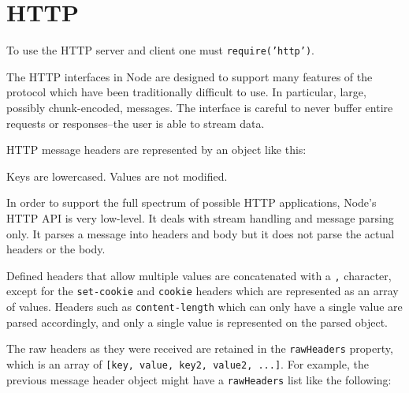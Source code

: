 \section{HTTP}

\begin{Shaded}
\begin{Highlighting}[]
\NormalTok{: } 
\end{Highlighting}
\end{Shaded}

To use the HTTP server and client one must \texttt{require('http')}.

The HTTP interfaces in Node are designed to support many features of the
protocol which have been traditionally difficult to use. In particular,
large, possibly chunk-encoded, messages. The interface is careful to
never buffer entire requests or responses--the user is able to stream
data.

HTTP message headers are represented by an object like this:

\begin{Shaded}
\begin{Highlighting}[]
\NormalTok{\{ }\NormalTok{: }\NormalTok{,}
  \NormalTok{: }\NormalTok{,}
  \NormalTok{: }\NormalTok{,}
  \NormalTok{: }\NormalTok{,}
  \NormalTok{: } \NormalTok{\}}
\end{Highlighting}
\end{Shaded}

Keys are lowercased. Values are not modified.

In order to support the full spectrum of possible HTTP applications,
Node's HTTP API is very low-level. It deals with stream handling and
message parsing only. It parses a message into headers and body but it
does not parse the actual headers or the body.

Defined headers that allow multiple values are concatenated with a
\texttt{,} character, except for the \texttt{set-cookie} and
\texttt{cookie} headers which are represented as an array of values.
Headers such as \texttt{content-length} which can only have a single
value are parsed accordingly, and only a single value is represented on
the parsed object.

The raw headers as they were received are retained in the
\texttt{rawHeaders} property, which is an array of
\texttt{{[}key, value, key2, value2, ...{]}}. For example, the previous
message header object might have a \texttt{rawHeaders} list like the
following:

